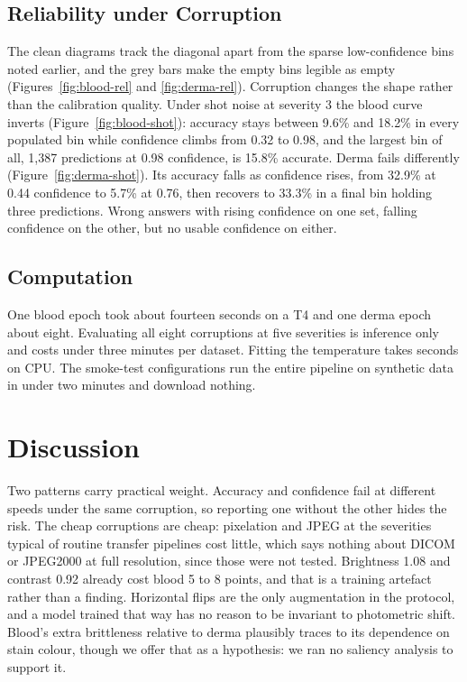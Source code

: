 \documentclass[a4paper,11pt,en,citestyle=authoryear,bibstyle=authoryear]{elegantpaper}
\begin{document}
\subsection{Reliability under Corruption}
The clean diagrams track the diagonal apart from the sparse low-confidence bins noted earlier, and the grey bars make the empty bins legible as empty (Figures~\ref{fig:blood-rel} and \ref{fig:derma-rel}). Corruption changes the shape rather than the calibration quality. Under shot noise at severity 3 the blood curve inverts (Figure~\ref{fig:blood-shot}): accuracy stays between 9.6\% and 18.2\% in every populated bin while confidence climbs from 0.32 to 0.98, and the largest bin of all, 1,387 predictions at 0.98 confidence, is 15.8\% accurate. Derma fails differently (Figure~\ref{fig:derma-shot}). Its accuracy falls as confidence rises, from 32.9\% at 0.44 confidence to 5.7\% at 0.76, then recovers to 33.3\% in a final bin holding three predictions. Wrong answers with rising confidence on one set, falling confidence on the other, but no usable confidence on either.
\subsection{Computation}
One blood epoch took about fourteen seconds on a T4 and one derma epoch about eight. Evaluating all eight corruptions at five severities is inference only and costs under three minutes per dataset. Fitting the temperature takes seconds on CPU. The smoke-test configurations run the entire pipeline on synthetic data in under two minutes and download nothing.

\section{Discussion}
Two patterns carry practical weight. Accuracy and confidence fail at different speeds under the same corruption, so reporting one without the other hides the risk. The cheap corruptions are cheap: pixelation and JPEG at the severities typical of routine transfer pipelines cost little, which says nothing about DICOM or JPEG2000 at full resolution, since those were not tested. Brightness 1.08 and contrast 0.92 already cost blood 5 to 8 points, and that is a training artefact rather than a finding. Horizontal flips are the only augmentation in the protocol, and a model trained that way has no reason to be invariant to photometric shift. Blood's extra brittleness relative to derma plausibly traces to its dependence on stain colour, though we offer that as a hypothesis: we ran no saliency analysis to support it.
\end{document}
